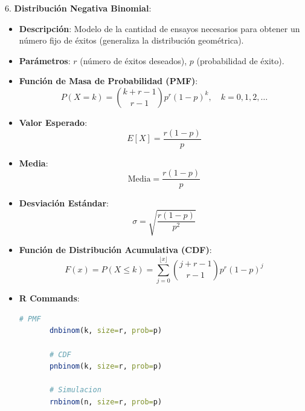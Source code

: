\documentclass{article}
\begin{document}
6. \textbf{{ \Large Distribución Negativa Binomial}}:
   \begin{itemize}
      

 \item \textbf{Descripción}: Modelo de la cantidad de ensayos necesarios para obtener un número fijo de éxitos (generaliza la distribución geométrica).
       \item \textbf{Parámetros}: \( r \) (número de éxitos deseados), \( p \) (probabilidad de éxito).
       \item \textbf{Función de Masa de Probabilidad (PMF)}:
       \[
       P(X=k) = \binom{k+r-1}{r-1} p^r (1-p)^k, \quad k = 0, 1, 2, \ldots
       \]
       \item \textbf{Valor Esperado}:
       \[
       E[X] = \frac{r(1-p)}{p}
       \]
       \item \textbf{Media}:
       \[
       \text{Media} = \frac{r(1-p)}{p}
       \]
       \item \textbf{Desviación Estándar}:
       \[
       \sigma = \sqrt{\frac{r(1-p)}{p^2}}
       \]
       \item \textbf{Función de Distribución Acumulativa (CDF)}:
       \[
       F(x) = P(X \leq k) = \sum_{j=0}^{\lfloor x \rfloor} \binom{j+r-1}{r-1} p^r (1-p)^j
       \]
       \item \textbf{R Commands}:
       \begin{lstlisting}[style=colored, language=R]
       # PMF
       dnbinom(k, size=r, prob=p)
       
       # CDF
       pnbinom(k, size=r, prob=p)
       
       # Simulacion
       rnbinom(n, size=r, prob=p)
       \end{lstlisting}
   \end{itemize}
\end{document}
